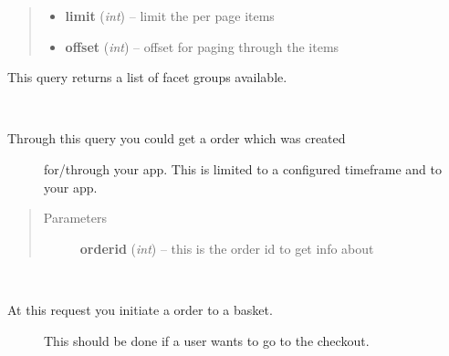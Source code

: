 \documentclass[letterpaper,10pt,english]{sphinxmanual}
\begin{document}
\begin{fulllineitems}
\begin{fulllineitems}
\begin{quote}
\begin{description}
\begin{itemize}
\item {} 
\textbf{limit} (\emph{int}) -- limit the per page items

\item {} 
\textbf{offset} (\emph{int}) -- offset for paging through the items

\end{itemize}

\end{description}\end{quote}

\end{fulllineitems}


\begin{fulllineitems}
\label{collins:collins.Collins.facettypes}
This query returns a list of facet groups available.

\end{fulllineitems}


\begin{fulllineitems}
\label{collins:collins.Collins.getorder}~\begin{description}
\item[{Through this query you could get a order which was created}] \leavevmode
for/through your app. This is limited to a configured
timeframe and to your app.

\end{description}
\begin{quote}\begin{description}
\item[{Parameters}] \leavevmode
\textbf{orderid} (\emph{int}) -- this is the order id to get info about

\end{description}\end{quote}

\end{fulllineitems}


\begin{fulllineitems}
\label{collins:collins.Collins.initiateorder}~\begin{description}
\item[{At this request you initiate a order to a basket.}] \leavevmode
This should be done if a user wants to go to the checkout.


\end{description}
\end{fulllineitems}
\end{fulllineitems}
\end{document}
